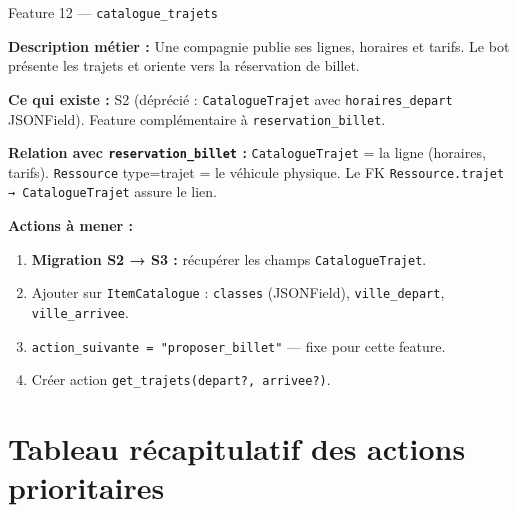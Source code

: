 \documentclass[11pt,a4paper]{article}
\newcommand{\slug}[1]{\texttt{\color{AGTDark}#1}}
\newcommand{\priom}[1]{\textcolor{AGTOrange}{\textbf{#1}}}
\begin{document}
\bigskip

\begin{featurebox}{Feature 12 — \slug{catalogue\_trajets}}

\textbf{Description métier :} Une compagnie publie ses lignes, horaires et tarifs.
Le bot présente les trajets et oriente vers la réservation de billet.

\textbf{Ce qui existe :} S2 (déprécié : \slug{CatalogueTrajet} avec
\slug{horaires\_depart} JSONField). Feature complémentaire à
\slug{reservation\_billet}.

\textbf{Relation avec \slug{reservation\_billet} :}
\slug{CatalogueTrajet} = la ligne (horaires, tarifs).
\slug{Ressource} type=trajet = le véhicule physique.
Le FK \slug{Ressource.trajet → CatalogueTrajet} assure le lien.

\medskip
\textbf{Actions à mener :}
\begin{enumerate}
  \item \priom{Migration S2 → S3 :} récupérer les champs \slug{CatalogueTrajet}.
  \item Ajouter sur \slug{ItemCatalogue} : \slug{classes} (JSONField),
        \slug{ville\_depart}, \slug{ville\_arrivee}.
  \item \slug{action\_suivante = "proposer\_billet"} — fixe pour cette feature.
  \item Créer action \slug{get\_trajets(depart?, arrivee?)}.
\end{enumerate}

\end{featurebox}

\section{Tableau récapitulatif des actions prioritaires}
\end{document}
